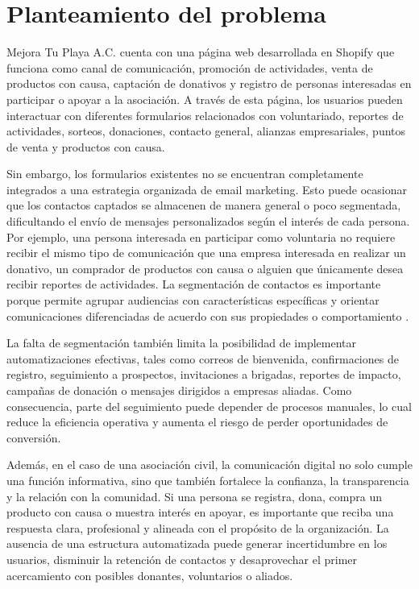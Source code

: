 \section{Planteamiento del problema}

Mejora Tu Playa A.C. cuenta con una página web desarrollada en Shopify que funciona como canal de comunicación, promoción de actividades, venta de productos con causa, captación de donativos y registro de personas interesadas en participar o apoyar a la asociación. A través de esta página, los usuarios pueden interactuar con diferentes formularios relacionados con voluntariado, reportes de actividades, sorteos, donaciones, contacto general, alianzas empresariales, puntos de venta y productos con causa.

Sin embargo, los formularios existentes no se encuentran completamente integrados a una estrategia organizada de email marketing. Esto puede ocasionar que los contactos captados se almacenen de manera general o poco segmentada, dificultando el envío de mensajes personalizados según el interés de cada persona. Por ejemplo, una persona interesada en participar como voluntaria no requiere recibir el mismo tipo de comunicación que una empresa interesada en realizar un donativo, un comprador de productos con causa o alguien que únicamente desea recibir reportes de actividades. La segmentación de contactos es importante porque permite agrupar audiencias con características específicas y orientar comunicaciones diferenciadas de acuerdo con sus propiedades o comportamiento \cite{hubspot_segments}.

La falta de segmentación también limita la posibilidad de implementar automatizaciones efectivas, tales como correos de bienvenida, confirmaciones de registro, seguimiento a prospectos, invitaciones a brigadas, reportes de impacto, campañas de donación o mensajes dirigidos a empresas aliadas. Como consecuencia, parte del seguimiento puede depender de procesos manuales, lo cual reduce la eficiencia operativa y aumenta el riesgo de perder oportunidades de conversión.

Además, en el caso de una asociación civil, la comunicación digital no solo cumple una función informativa, sino que también fortalece la confianza, la transparencia y la relación con la comunidad. Si una persona se registra, dona, compra un producto con causa o muestra interés en apoyar, es importante que reciba una respuesta clara, profesional y alineada con el propósito de la organización. La ausencia de una estructura automatizada puede generar incertidumbre en los usuarios, disminuir la retención de contactos y desaprovechar el primer acercamiento con posibles donantes, voluntarios o aliados.

